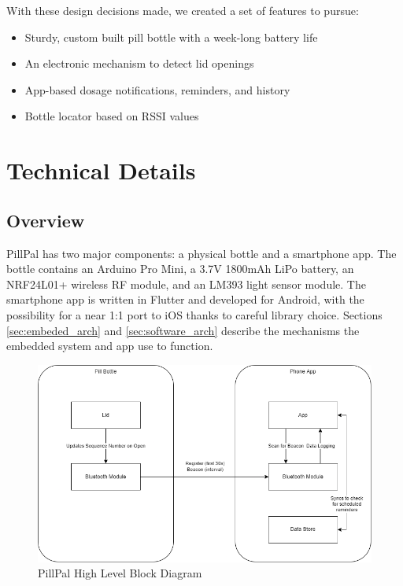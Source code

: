 \documentclass[sigconf]{acmart}
\begin{document}
With these design decisions made, we created a set of features to pursue:
\begin{itemize}
  \item Sturdy, custom built pill bottle with a week-long battery life
  \item An electronic mechanism to detect lid openings
  \item App-based dosage notifications, reminders, and history
  \item Bottle locator based on RSSI values
\end{itemize}

\section{Technical Details}

\subsection{Overview}
\label{sec:overview}
PillPal has two major components: a physical bottle and a smartphone app. The bottle contains an Arduino Pro Mini, a 3.7V 1800mAh LiPo battery, an NRF24L01+ wireless RF module, and an LM393 light sensor module. The smartphone app is written in Flutter and developed for Android, with the possibility for a near 1:1 port to iOS thanks to careful library choice. Sections \ref{sec:embeded_arch} and \ref{sec:software_arch} describe the mechanisms the embedded system and app use to function.

\begin{figure}[h]
  \centering
  \includegraphics[width=\linewidth]{images/pillpal_block.png}
  \caption{PillPal High Level Block Diagram}
  \label{fig:high_block}
\end{figure}
\end{document}

